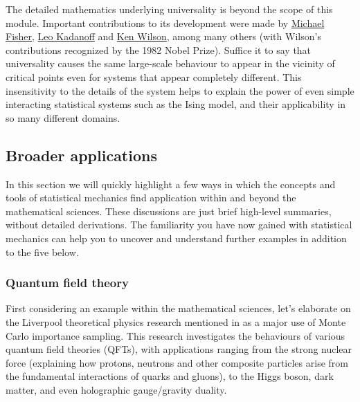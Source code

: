 The detailed mathematics underlying universality is beyond the scope of this module.
Important contributions to its development were made by \href{https://en.wikipedia.org/wiki/Michael_Fisher}{Michael Fisher}, \href{https://en.wikipedia.org/wiki/Leo_Kadanoff}{Leo Kadanoff} and \href{https://en.wikipedia.org/wiki/Kenneth_G._Wilson}{Ken Wilson}, among many others (with Wilson's contributions recognized by the 1982 Nobel Prize).
Suffice it to say that universality causes the same large-scale behaviour to appear in the vicinity of critical points even for systems that appear completely different.
This insensitivity to the details of the system helps to explain the power of even simple interacting statistical systems such as the Ising model, and their applicability in so many different domains. %



\subsection{\label{sec:broad}Broader applications}
In this section we will quickly highlight a few ways in which the concepts and tools of statistical mechanics find application within and beyond the mathematical sciences.
These discussions are just brief high-level summaries, without detailed derivations.
The familiarity you have now gained with statistical mechanics can help you to uncover and understand further examples in addition to the five below.

\subsubsection*{Quantum field theory}
First considering an example within the mathematical sciences, let's elaborate on the Liverpool theoretical physics research mentioned in  as a major use of Monte Carlo importance sampling.
This research investigates the behaviours of various quantum field theories (QFTs), with applications ranging from the strong nuclear force (explaining how protons, neutrons and other composite particles arise from the fundamental interactions of quarks and gluons), to the Higgs boson, dark matter, and even holographic gauge/gravity duality.

